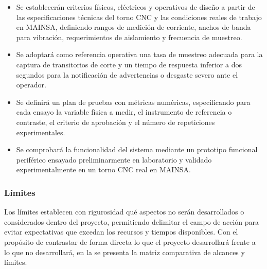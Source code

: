 \begin{itemize}
\item Se establecerán criterios físicos, eléctricos y operativos de diseño a partir de las especificaciones técnicas del torno CNC y las condiciones reales de trabajo en MAINSA, definiendo rangos de medición de corriente, anchos de banda para vibración, requerimientos de aislamiento y frecuencia de muestreo.
\item Se adoptará como referencia operativa una tasa de muestreo adecuada para la captura de transitorios de corte y un tiempo de respuesta inferior a dos segundos para la notificación de advertencias o desgaste severo ante el operador.
\item Se definirá un plan de pruebas con métricas numéricas, especificando para cada ensayo la variable física a medir, el instrumento de referencia o contraste, el criterio de aprobación y el número de repeticiones experimentales.
\item Se comprobará la funcionalidad del sistema mediante un prototipo funcional periférico ensayado preliminarmente en laboratorio y validado experimentalmente en un torno CNC real en MAINSA.
\end{itemize}

\subsubsection{Límites}
\label{subsubsec:limites}

Los límites establecen con rigurosidad qué aspectos no serán desarrollados o considerados dentro del proyecto, permitiendo delimitar el campo de acción para evitar expectativas que excedan los recursos y tiempos disponibles. Con el propósito de contrastar de forma directa lo que el proyecto desarrollará frente a lo que no desarrollará, en la  se presenta la matriz comparativa de alcances y límites.

